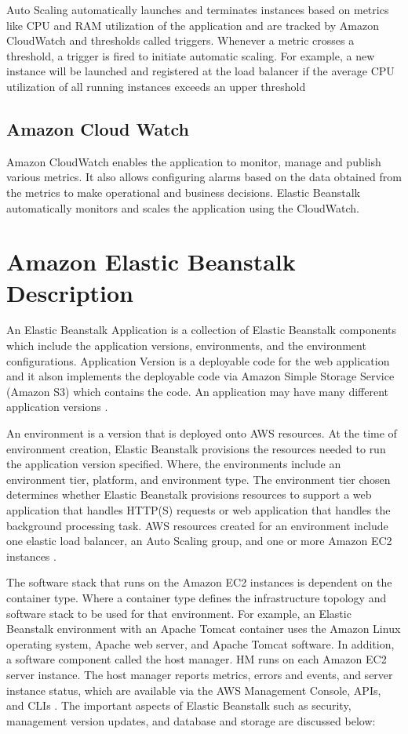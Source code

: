 \documentclass[9pt,twocolumn,twoside]{../../styles/osajnl}
\begin{document}
Auto Scaling automatically launches and terminates instances based on
metrics like CPU and RAM utilization of the application and are
tracked by Amazon CloudWatch and thresholds called triggers. Whenever
a metric crosses a threshold, a trigger is fired to initiate automatic
scaling.  For example, a new instance will be launched and registered
at the load balancer if the average CPU utilization of all running
instances exceeds an upper threshold
    
\subsection{Amazon Cloud Watch}

Amazon CloudWatch enables the application to monitor, manage and
publish various metrics. It also allows configuring alarms based on
the data obtained from the metrics to make operational and business
decisions. Elastic Beanstalk automatically monitors and scales the
application using the CloudWatch.

\section{Amazon Elastic Beanstalk Description}

An Elastic Beanstalk Application is a collection of Elastic Beanstalk
components which include the application versions, environments, and
the environment configurations. Application Version is a deployable
code for the web application and it alson implements the
deployable code via Amazon Simple Storage Service (Amazon S3) which
contains the code. An application may have many different application
versions \cite{elastic-component}.


An environment is a version that is deployed onto AWS resources.  At
the time of environment creation, Elastic Beanstalk provisions the
resources needed to run the application version specified. Where, the
environments include an environment tier, platform, and environment
type. The environment tier chosen determines whether Elastic Beanstalk
provisions resources to support a web application that handles HTTP(S)
requests or web application that handles the background processing
task. AWS resources created for an environment include one elastic
load balancer, an Auto Scaling group, and one or more Amazon EC2
instances \cite{elastic-architecture}.

The software stack that runs on the Amazon EC2 instances is dependent
on the container type. Where a container type defines the
infrastructure topology and software stack to be used for that
environment. For example, an Elastic Beanstalk environment with an
Apache Tomcat container uses the Amazon Linux operating system, Apache
web server, and Apache Tomcat software. In addition, a software
component called the host manager. HM runs on each Amazon EC2 server
instance. The host manager reports metrics, errors and events, and
server instance status, which are available via the AWS Management
Console, APIs, and CLIs \cite{elastic-architecture}. The important
aspects of Elastic Beanstalk such as security, management version
updates, and database and storage are discussed below:
\end{document}
